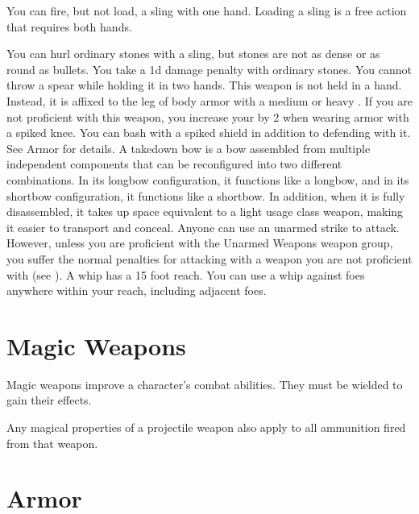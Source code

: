          You can fire, but not load, a sling with one hand. Loading a sling is a free action that requires both hands.
        \par You can hurl ordinary stones with a sling, but stones are not as dense or as round as bullets. You take a \minus1d damage penalty with ordinary stones.
         You cannot throw a spear while holding it in two hands.
         This weapon is not held in a hand.
        Instead, it is affixed to the leg of body armor with a medium or heavy .
        If you are not proficient with this weapon, you increase your  by 2 when wearing armor with a spiked knee.
         You can bash with a spiked shield in addition to defending with it. See Armor for details.
         A takedown bow is a bow assembled from multiple independent components that can be reconfigured into two different combinations.
        In its longbow configuration, it functions like a longbow, and in its shortbow configuration, it functions like a shortbow.
        In addition, when it is fully disassembled, it takes up space equivalent to a light usage class weapon, making it easier to transport and conceal.
         Anyone can use an unarmed strike to attack.
        However, unless you are proficient with the Unarmed Weapons weapon group, you suffer the normal penalties for attacking with a weapon you are not proficient with (see ).
         A whip has a 15 foot reach.
        You can use a whip against foes anywhere within your reach, including adjacent foes.

\newpage
\section{Magic Weapons}
    Magic weapons improve a character's combat abilities.
    They must be wielded to gain their effects.

     Any magical properties of a projectile weapon also apply to all ammunition fired from that weapon.

    

    

\newpage
\section{Armor}\label{Armor}

